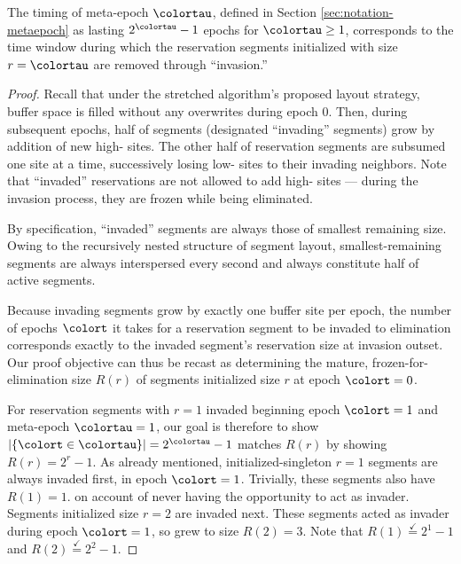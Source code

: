 \begin{lemma}
\label{thm:stretched-meta-epoch}

The timing of meta-epoch $\colortau$, defined in Section \ref{sec:notation-metaepoch} as lasting $2^{\colortau} - 1$ epochs for $\colortau\geq1$, corresponds to the time window during which the reservation segments initialized with size $r=\colortau$ are removed through ``invasion.''
\end{lemma}

\begin{proof}

Recall that under the stretched algorithm's proposed layout strategy, buffer space is filled without any overwrites during epoch 0.
Then, during subsequent epochs, half of segments (designated ``invading'' segments) grow by addition of new high-\hv{} sites.
The other half of reservation segments are subsumed one site at a time, successively losing low-\hv{} sites to their invading neighbors.
Note that ``invaded'' reservations are not allowed to add high-\hv{} sites --- during the invasion process, they are frozen while being eliminated.

By specification, ``invaded'' segments are always those of smallest remaining size.
Owing to the recursively nested structure of segment layout, smallest-remaining segments are always interspersed every second and always constitute half of active segments.

Because invading segments grow by exactly one buffer site per epoch, the number of epochs $\colort$ it takes for a reservation segment to be invaded to elimination corresponds exactly to the invaded segment's reservation size at invasion outset.
Our proof objective can thus be recast as determining the mature, frozen-for-elimination size $R(r)$ of segments initialized size $r$ at epoch $\colort=0$.

For reservation segments with $r=1$ invaded beginning epoch $\colort=1$ and meta-epoch $\colortau = 1$, our goal is therefore to show $|\{\colort \in \colortau\}| = 2^{\colortau} - 1$ matches $R(r)$ by showing $R(r) = 2^{r} - 1$.
As already mentioned, initialized-singleton $r=1$ segments are always invaded first, in epoch $\colort=1$.
Trivially, these segments also have $R(1) = 1$. on account of never having the opportunity to act as invader.
Segments initialized size $r=2$ are invaded next.
These segments acted as invader during epoch $\colort=1$, so grew to size $R(2) = 3$.
Note that $R(1) \stackrel{\checkmark}{=} 2^1 - 1$ and $R(2) \stackrel{\checkmark}{=} 2^2 - 1$.


\end{proof}
